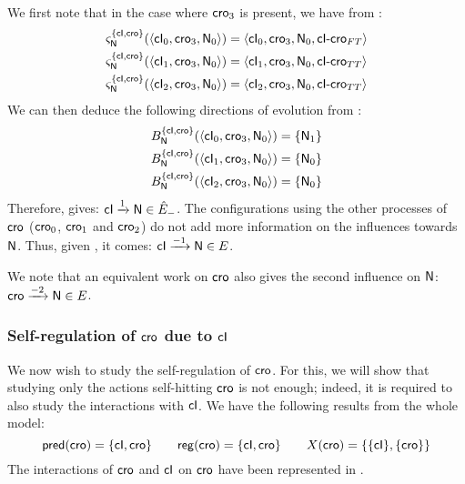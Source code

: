 We first note that in the case where $\mathsf{cro}_3$ is present, we have from :
\begin{align*}
  \varsigma_{\mathsf{N}}^{\{ \mathsf{cI}, \mathsf{cro} \}}(\langle \mathsf{cI}_0, \mathsf{cro}_3, \mathsf{N}_0 \rangle)
    &= \langle \mathsf{cI}_0, \mathsf{cro}_3, \mathsf{N}_0, \mathsf{cI\mbox{-}cro}_{FT} \rangle \\
  \varsigma_{\mathsf{N}}^{\{ \mathsf{cI}, \mathsf{cro} \}}(\langle \mathsf{cI}_1, \mathsf{cro}_3, \mathsf{N}_0 \rangle)
    &= \langle \mathsf{cI}_1, \mathsf{cro}_3, \mathsf{N}_0, \mathsf{cI\mbox{-}cro}_{TT} \rangle \\
  \varsigma_{\mathsf{N}}^{\{ \mathsf{cI}, \mathsf{cro} \}}(\langle \mathsf{cI}_2, \mathsf{cro}_3, \mathsf{N}_0 \rangle)
    &= \langle \mathsf{cI}_2, \mathsf{cro}_3, \mathsf{N}_0, \mathsf{cI\mbox{-}cro}_{TT} \rangle
\end{align*}
We can then deduce the following directions of evolution from :
\begin{align*}
  B_{\mathsf{N}}^{\{ \mathsf{cI}, \mathsf{cro} \}}(\langle \mathsf{cI}_0, \mathsf{cro}_3, \mathsf{N}_0 \rangle) &= \{ \mathsf{N}_1 \} \\
  B_{\mathsf{N}}^{\{ \mathsf{cI}, \mathsf{cro} \}}(\langle \mathsf{cI}_1, \mathsf{cro}_3, \mathsf{N}_0 \rangle) &= \{ \mathsf{N}_0 \} \\
  B_{\mathsf{N}}^{\{ \mathsf{cI}, \mathsf{cro} \}}(\langle \mathsf{cI}_2, \mathsf{cro}_3, \mathsf{N}_0 \rangle) &= \{ \mathsf{N}_0 \}
\end{align*}
Therefore,  gives: $\mathsf{cI} \xrightarrow{1} \mathsf{N} \in \hat{E}_-$.
The configurations using the other processes of $\mathsf{cro}$ ($\mathsf{cro}_0$, $\mathsf{cro}_1$ and $\mathsf{cro}_2$)
do not add more information on the influences towards $\mathsf{N}$.
Thus, given , it comes: $\mathsf{cI} \xrightarrow{- 1} \mathsf{N} \in E$.

We note that an equivalent work on $\mathsf{cro}$ also gives the second influence on $\mathsf{N}$:
$\mathsf{cro} \xrightarrow{- 2} \mathsf{N} \in E$.



\subsubsection{Self-regulation of $\mathsf{cro}$ due to $\mathsf{cI}$}

We now wish to study the self-regulation of $\mathsf{cro}$.
For this, we will show that studying only the actions self-hitting $\mathsf{cro}$ is not enough;
indeed, it is required to also study the interactions with $\mathsf{cI}$.
We have the following results from the whole model:
\[\mathsf{pred}(\mathsf{cro}) = \{ \mathsf{cI}, \mathsf{cro} \} \qquad
  \mathsf{reg}({\mathsf{cro}}) = \{ \mathsf{cI}, \mathsf{cro} \} \qquad
  X(\mathsf{cro}) = \{ \{ \mathsf{cI} \}, \{ \mathsf{cro} \} \}\]
The interactions of $\mathsf{cro}$ and $\mathsf{cI}$ on $\mathsf{cro}$ have been represented in
.

